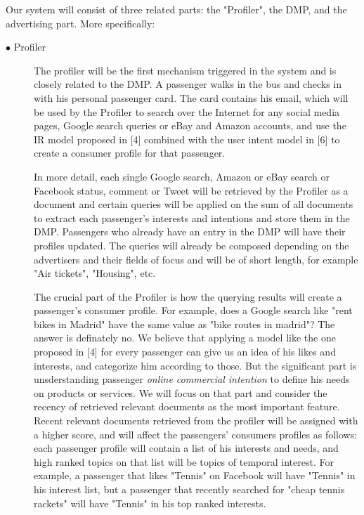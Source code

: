 \documentclass[letterpaper,11pt]{article}
\begin{document}
Our system will consist of three related parts: the "Profiler", the DMP, and the advertising part. More specifically: 
\begin{description}
\item[$\bullet$ Profiler]

The profiler will be the first mechanism triggered in the system and is closely related to the DMP. A passenger walks in the bus and checks in with his personal passenger card. The card contains his email, which will be used by the Profiler to search over the Internet for any social media pages, Google search queries or eBay and Amazon accounts, and use the IR model proposed in [4] combined with the user intent model in [6] to create a consumer profile for that passenger.

 In more detail, each single Google search, Amazon or eBay search or Facebook status, comment or Tweet will be retrieved by the Profiler as a document and certain queries will be applied on the sum of all documents to extract each passenger's interests and intentions and store them in the DMP. Passengers who already have an entry in the DMP will have their profiles updated. The queries will already be composed depending on the advertisers and their fields of focus and will be of short length, for example "Air tickets", "Housing", etc.
 
 The crucial part of the Profiler is how the querying results will create a passenger's consumer profile. For example, does a Google search like "rent bikes in Madrid" have the same value as "bike routes in madrid"? The answer is definately no. We believe that applying a model like the one proposed in [4] for every passenger can give us an idea of his likes and interests, and categorize him according to those. But the significant part is unsderstanding passenger \emph{online commercial intention} to define his needs on products or services. We will focus on that part and consider the recency of retrieved relevant documents as the most important feature. Recent relevant documents retrieved from the profiler will be assigned with a higher score, and will affect the passengers' consumers profiles as follows: each passenger profile will contain a list of his interests and needs, and high ranked topics on that list will be topics of temporal interest. For example, a passenger that likes "Tennis" on Facebook will have "Tennis" in his interest list, but a passenger that recently searched for "cheap tennis rackets" will have "Tennis" in his top ranked interests.
 

\end{description}
\end{document}
